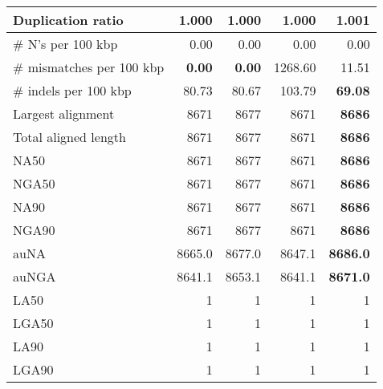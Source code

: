 \documentclass[12pt,a4paper]{article}
\begin{document}
\begin{table}[ht]
\begin{center}
\begin{tabular}{|l*{4}{|r}|}
Duplication ratio & {\bf 1.000} & {\bf 1.000} & {\bf 1.000} & 1.001 \\ \hline
\# N's per 100 kbp & 0.00 & 0.00 & 0.00 & 0.00 \\ \hline
\# mismatches per 100 kbp & {\bf 0.00} & {\bf 0.00} & 1268.60 & 11.51 \\ \hline
\# indels per 100 kbp & 80.73 & 80.67 & 103.79 & {\bf 69.08} \\ \hline
Largest alignment & 8671 & 8677 & 8671 & {\bf 8686} \\ \hline
Total aligned length & 8671 & 8677 & 8671 & {\bf 8686} \\ \hline
NA50 & 8671 & 8677 & 8671 & {\bf 8686} \\ \hline
NGA50 & 8671 & 8677 & 8671 & {\bf 8686} \\ \hline
NA90 & 8671 & 8677 & 8671 & {\bf 8686} \\ \hline
NGA90 & 8671 & 8677 & 8671 & {\bf 8686} \\ \hline
auNA & 8665.0 & 8677.0 & 8647.1 & {\bf 8686.0} \\ \hline
auNGA & 8641.1 & 8653.1 & 8641.1 & {\bf 8671.0} \\ \hline
LA50 & 1 & 1 & 1 & 1 \\ \hline
LGA50 & 1 & 1 & 1 & 1 \\ \hline
LA90 & 1 & 1 & 1 & 1 \\ \hline
LGA90 & 1 & 1 & 1 & 1 \\ \hline
\end{tabular}
\end{center}
\end{table}
\end{document}
